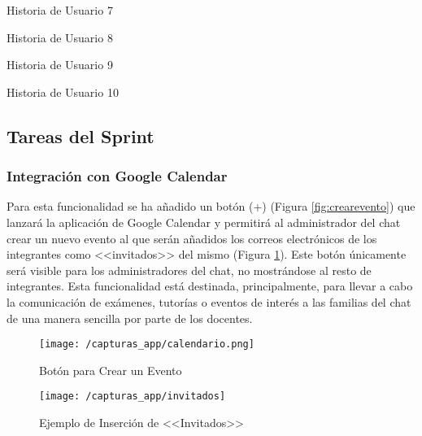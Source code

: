\begin{table}[hp]
	\centering
	{\small
		
	}
	\caption[Historia de Usuario 7]
	{Historia de Usuario 7}
	\label{tab:historia7}
\end{table}

\begin{table}[hp]
	\centering
	{\small
		
	}
	\caption[Historia de Usuario 8]
	{Historia de Usuario 8}
	\label{tab:historia8}
\end{table}

\clearpage

\begin{table}[hp]
	\centering
	{\small
		
	}
	\caption[Historia de Usuario 9]
	{Historia de Usuario 9}
	\label{tab:historia9}
\end{table}

\begin{table}[!htbp]
	\centering
	{\small
		
	}
	\caption[Historia de Usuario 10]
	{Historia de Usuario 10}
	\label{tab:historia10}
\end{table}

\clearpage

\subsection{Tareas del Sprint}
\subsubsection{Integración con Google Calendar}
Para esta funcionalidad se ha añadido un botón (+) (Figura \ref{fig:crearevento}) que lanzará la aplicación de Google Calendar y permitirá al administrador del chat crear un nuevo evento al que serán añadidos los correos electrónicos de los integrantes como <<invitados>> del mismo (Figura \ref{fig:invitados}). Este botón únicamente será visible para los administradores del chat, no mostrándose al resto de integrantes. Esta funcionalidad está destinada, principalmente, para llevar a cabo la comunicación de exámenes, tutorías o eventos de interés a las familias del chat de una manera sencilla por parte de los docentes.

\begin{figure}[!h]
	\centering
	\begin{minipage}{.5\textwidth}
		\centering
		\texttt{[image: /capturas\_app/calendario.png]}
		\caption{Botón para Crear un Evento}
		\label{fig:crearevento}
	\end{minipage}%
	\begin{minipage}{.5\textwidth}
		\centering
		\texttt{[image: /capturas\_app/invitados]}
		\caption{Ejemplo de Inserción de <<Invitados>>}
		\label{fig:invitados}
	\end{minipage}
\end{figure}

